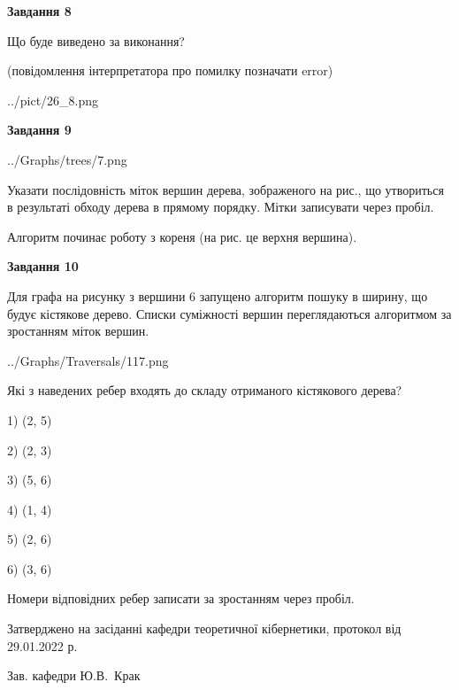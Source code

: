 \documentclass[12pt, ukrainian]{article}
\begin{document}
{\begin {large}
{\begin {center}\textbf{Завдання 8}\end {center}}\par
Що буде виведено за виконання?\par
 (повідомлення інтерпретатора про помилку позначати error)\par
\begin{center}
	{../pict/26_8.png}
\end{center}
\newpage

{\begin {center}\textbf{Завдання 9}\end {center}}\par

\begin{center}
	{../Graphs/trees/7.png}
\end{center}
Указати послідовність міток вершин дерева, зображеного на рис., що утвориться в результаті обходу дерева в прямому порядку. Мітки записувати через пробіл.\par Алгоритм починає роботу з кореня (на рис. це верхня вершина).\par
\newpage

{\begin {center}\textbf{Завдання 10}\end {center}}\par
Для графа на рисунку з вершини 6 запущено алгоритм пошуку в ширину, що будує кістякове дерево. Списки суміжності вершин переглядаються алгоритмом за зростанням міток вершин.\par
\begin{center}
	{../Graphs/Traversals/117.png}
\end{center}
\par Які з наведених ребер входять до складу отриманого кістякового дерева?\par
1) (2, 5)\par
2) (2, 3)\par
3) (5, 6)\par
4) (1, 4)\par
5) (2, 6)\par
6) (3, 6)\par
{\vskip 15pt} Номери відповідних ребер записати за зростанням через пробіл.\par
\newpage


\end {large}
}
{\smallskip \begin {small} Затверджено на засіданні кафедри теоретичної кібернетики, протокол  від   29.01.2022 р.\par\smallskip\smallskip
{\parbox {6.5 cm}{Зав. кафедри \dotfill Ю.В.~Крак}} \end{small}}
\end{document}
